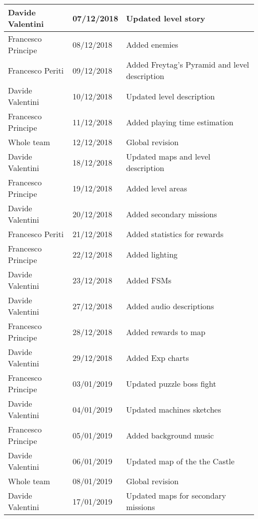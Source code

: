 \begin{longtable}[H]{|l|l|l|}
Davide Valentini & 07/12/2018 & Updated level story \\ \hline
Francesco Principe & 08/12/2018 & Added enemies \\ \hline
Francesco Periti & 09/12/2018 & Added Freytag's Pyramid and level description \\ \hline
Davide Valentini & 10/12/2018 & Updated level description \\ \hline
Francesco Principe & 11/12/2018 & Added playing time estimation \\ \hline
Whole team & 12/12/2018 & Global revision \\ \hline

Davide Valentini & 18/12/2018 & Updated maps and level description \\ \hline
Francesco Principe & 19/12/2018 & Added level areas \\ \hline
Davide Valentini & 20/12/2018 & Added secondary missions \\ \hline
Francesco Periti & 21/12/2018 & Added statistics for rewards \\ \hline
Francesco Principe & 22/12/2018 & Added lighting \\ \hline
Davide Valentini & 23/12/2018 & Added FSMs \\ \hline
Davide Valentini & 27/12/2018 & Added audio descriptions \\ \hline
Francesco Principe & 28/12/2018 & Added rewards to map \\ \hline
Davide Valentini & 29/12/2018 & Added Exp charts \\ \hline
Francesco Principe & 03/01/2019 & Updated puzzle boss fight \\ \hline
Davide Valentini & 04/01/2019 & Updated machines sketches \\ \hline
Francesco Principe & 05/01/2019 & Added background music \\ \hline
Davide Valentini & 06/01/2019 & Updated map of the the Castle \\ \hline
Whole team & 08/01/2019 & Global revision \\ \hline
Davide Valentini & 17/01/2019 & Updated maps for secondary missions \\ \hline
\end{longtable}
